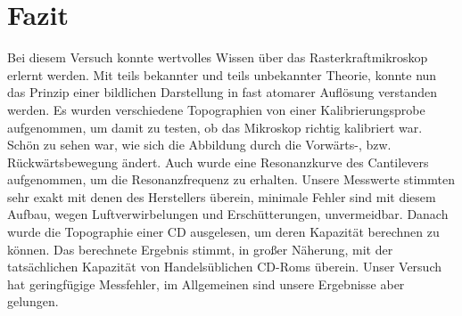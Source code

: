 \chapter{Fazit}

Bei diesem Versuch konnte wertvolles Wissen über das Rasterkraftmikroskop erlernt werden.
Mit teils bekannter und teils unbekannter Theorie, konnte nun das Prinzip einer bildlichen Darstellung in fast atomarer Auflösung verstanden werden.
Es wurden verschiedene Topographien von einer Kalibrierungsprobe aufgenommen, um damit zu testen, ob das Mikroskop richtig kalibriert war.
Schön zu sehen war, wie sich die Abbildung durch die Vorwärts-, bzw. Rückwärtsbewegung ändert.
Auch wurde eine Resonanzkurve des Cantilevers aufgenommen, um die Resonanzfrequenz zu erhalten.
Unsere Messwerte stimmten sehr exakt mit denen des Herstellers überein, minimale Fehler sind mit diesem Aufbau, wegen Luftverwirbelungen und Erschütterungen, unvermeidbar.
Danach wurde die Topographie einer CD ausgelesen, um deren Kapazität berechnen zu können.
Das berechnete Ergebnis stimmt, in großer Näherung, mit der tatsächlichen Kapazität von Handelsüblichen CD-Roms überein.
Unser Versuch hat geringfügige Messfehler, im Allgemeinen sind unsere Ergebnisse aber gelungen.
